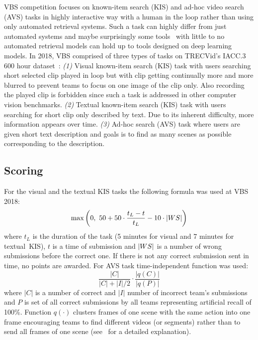 VBS competition focuses on known-item search (KIS) and ad-hoc video search (AVS) tasks in highly interactive
way with a human in the loop rather than using only automated retrieval systems. Such a task can highly differ from just automated systems and maybe surprisingly some tools~\cite{Storyboard-Based_Interface,duane2018virtual} with little to no automated retrieval models can hold up to tools designed on deep learning models. In 2018, VBS comprised of three types of tasks on TRECVid's IACC.3 600 hour dataset~\cite{awad2016trecvid}: \textit{(1)} Visual known-item search (KIS) task with users searching short selected clip played in loop but with clip getting continually more and more blurred to prevent teams to focus on one image of the clip only. Also recording the played clip is forbidden since such a task is addressed in other computer vision benchmarks. \textit{(2)} Textual known-item search (KIS) task with users searching for short clip only described by text. Due to its inherent difficulty, more information appears over time. \textit{(3)} Ad-hoc search (AVS) task where users are given short text description and goals is to find as many scenes as possible corresponding to the description.

\subsection{Scoring}
For the visual and the textual KIS tasks the following formula was used at VBS 2018:
\begin{equation}
\max\left(0,\ 50 + 50\cdot\frac{t_L-t}{t_L} - 10\cdot\left|{WS}\right|\right)
\end{equation}
where $t_L$ is the duration of the task (5 minutes for visual and 7 minutes for textual~KIS), $t$ is a time of submission and $\left|{WS}\right|$ is a number of wrong submissions before the correct one. If there is not any correct submission sent in time, no points are awarded. For AVS task time-independent function was used:
\begin{equation}
\frac{|C|}{|C|+|I|/2}\cdot\frac{|q(C)|}{|q(P)|}
\end{equation}
where $|C|$ is a number of correct and $|I|$ number of incorrect team's submissions and $P$ is set of all correct submissions by all teams representing artificial recall of 100\%. Function $q(\cdot)$ clusters frames of one scene with the same action into one frame encouraging teams to find different videos (or segments) rather than to send all frames of one scene (see~\cite{Lokoc-influential-trends} for a detailed explanation).

